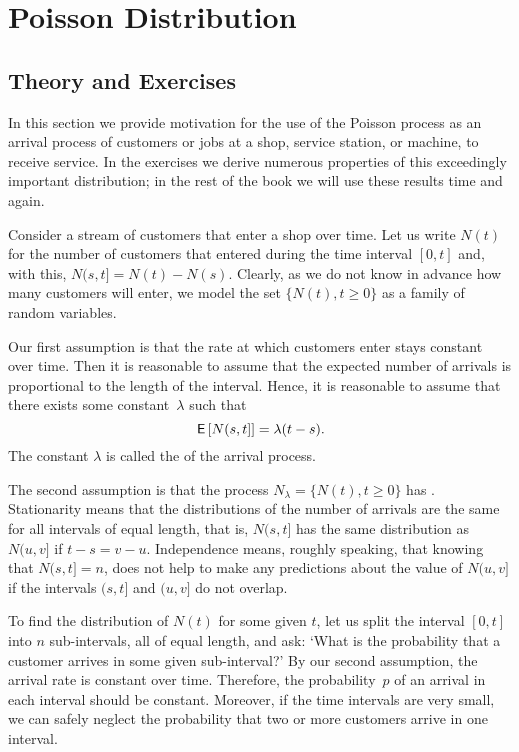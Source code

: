 \section{Poisson Distribution}
\label{sec:poisson-distribution}

\subsection*{Theory and Exercises}



In this section we provide motivation for the use of the Poisson process as an arrival process of customers or jobs at a shop, service station, or machine, to receive service.  In the exercises we derive numerous  properties of  this exceedingly important distribution; in the rest of the book we will use these results time and again.

Consider a stream of customers that enter a shop over time.
Let us write $N(t)$ for the number of customers that entered during the time interval $[0,t]$ and, with this, $N(s, t] = N(t)-N(s)$.
Clearly, as we do not know in advance how many customers will enter, we model the set $\{N(t), t\geq 0\}$ as a family of  random variables.

Our first assumption is that the rate at which customers enter stays constant over time. Then it is reasonable to assume that
the expected number of arrivals is proportional to the  length of
the interval. Hence, it is reasonable to assume that there exists some
constant~$\lambda$ such that
\begin{equation}
  \label{eq:6}
 \,\mathsf{E}\left[N(s,t]\right] = \lambda (t-s).
\end{equation}
The constant $\lambda$ is called the  of the arrival process.


The second assumption is that the process $N_\lambda = \{N(t), t\geq 0\}$ has .
Stationarity means that the distributions of the number of arrivals are the same for all intervals of equal length, that is, 
$N(s,t]$ has the same distribution as $N(u, v]$ if $t-s = v-u$.
Independence means, roughly speaking, that knowing that $N(s,t]= n$, does not help to make any predictions about the value of $N(u, v]$ if the intervals $(s,t]$ and $(u, v]$ do not overlap.



To find the distribution of $N(t)$ for some given $t$, let us split the interval $[0,t]$ into $n$ sub-intervals, all of equal length, and ask: `What is the probability that a customer arrives in some given sub-interval?'
By our second assumption, the arrival rate is constant over time.
Therefore, the probability~$p$ of an arrival in each interval should be constant.
Moreover, if the time intervals are very small, we can safely neglect the probability that two or more customers arrive in one interval.


